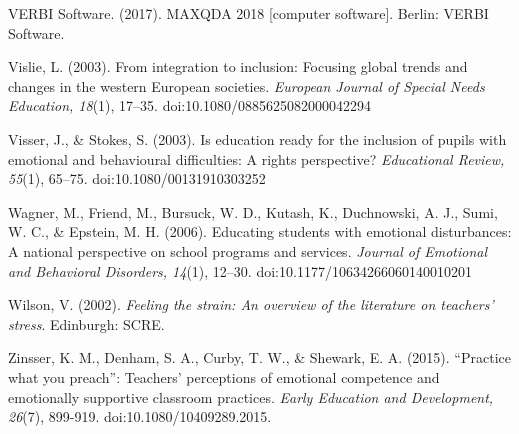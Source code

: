 \documentclass[11.5pt]{sig-alternate} %
\begin{document}
VERBI Software. (2017). MAXQDA 2018 [computer software]. Berlin: VERBI Software. 

Vislie, L. (2003). From integration to inclusion: Focusing global trends and changes in the western European societies. \textit{European Journal of Special Needs Education, 18}(1), 17–35. doi:10.1080/0885625082000042294

Visser, J., \& Stokes, S. (2003). Is education ready for the inclusion of pupils with emotional and behavioural difficulties: A rights perspective? \textit{Educational Review, 55}(1), 65–75. doi:10.1080/00131910303252

Wagner, M., Friend, M., Bursuck, W. D., Kutash, K., Duchnowski, A. J., Sumi, W. C., \& Epstein, M. H. (2006). Educating students with emotional disturbances: A national perspective on school programs and services. \textit{Journal of Emotional and Behavioral Disorders, 14}(1), 12–30. doi:10.1177/10634266060140010201

Wilson, V. (2002). \textit{Feeling the strain: An overview of the literature on teachers' stress}. Edinburgh: SCRE.

Zinsser, K. M., Denham, S. A., Curby, T. W., \& Shewark, E. A. (2015). “Practice what you preach”: Teachers’ perceptions of emotional competence and emotionally supportive classroom practices. \textit{Early Education and Development, 26}(7), 899-919. doi:10.1080/10409289.2015.
\end{document}
